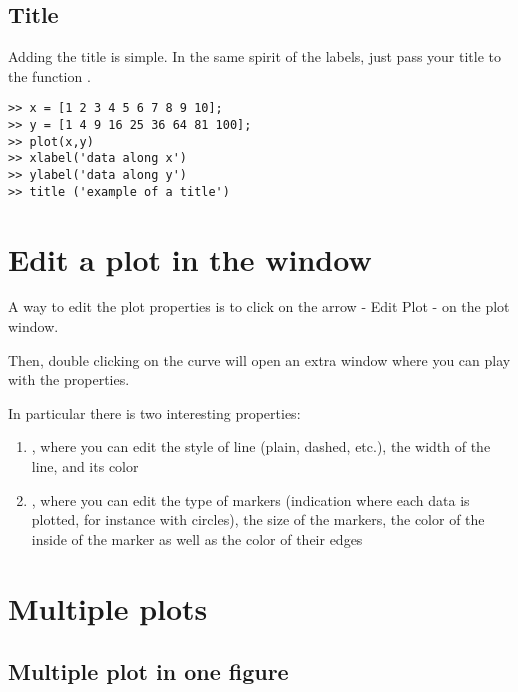 	\subsection{Title}
		Adding the title is simple.
		In the same spirit of the labels, just pass your title to the function .
\begin{lstlisting}
>> x = [1 2 3 4 5 6 7 8 9 10];
>> y = [1 4 9 16 25 36 64 81 100];
>> plot(x,y)
>> xlabel('data along x')
>> ylabel('data along y')
>> title ('example of a title')
\end{lstlisting}

\section{Edit a plot in the window}
	A way to edit the plot properties is to click on the arrow - Edit Plot - on the plot window.


	Then, double clicking on the curve will open an extra window where you can play with the properties.

	In particular there is two interesting properties:
	\begin{enumerate}
		\item {}, where you can edit the style of line (plain, dashed, etc.), the width of the line, and its color
		\item {}, where you can edit the type of markers (indication where each data is plotted, for instance with circles), the size of the markers, the color of the inside of the marker as well as the color of their edges
	\end{enumerate}

\section{Multiple plots}
	\subsection{Multiple plot in one figure}
